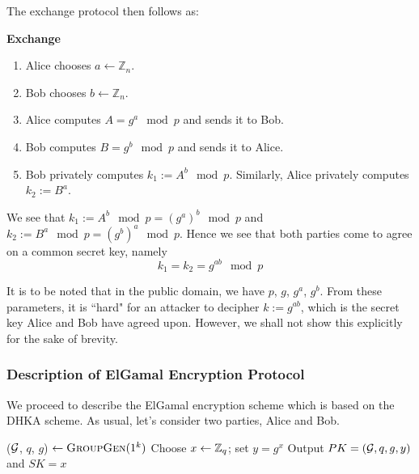 The exchange protocol then follows as:

\begin{tcolorbox}
\textbf{Exchange} 
\begin{enumerate}
    \item Alice chooses \( a \leftarrow \mathbb{Z}_n \). 
    \item Bob chooses \( b \leftarrow \mathbb{Z}_n \).
    \item Alice computes \( A = g^a \mod p \) and sends it to Bob.
    \item Bob computes \( B = g^b \mod p \) and sends it to Alice.
    \item Bob privately computes \( k_1 := A^b \mod p \). Similarly, Alice privately computes \( k_2 := B^a \).
\end{enumerate}
\end{tcolorbox}

We see that \( k_1 := A^b \mod p = (g^a)^b \mod p \) and \( k_2 := B^a \mod p = (g^b)^a \mod p \). Hence we see that both parties come to agree on a common secret key, namely
\begin{equation}
    k_1 = k_2 = g^{ab} \mod p
\end{equation}

It is to be noted that in the public domain, we have \( p \), \( g \), \( g^a \), \( g^b \). 
From these parameters, it is ``hard" for an attacker to decipher \( k := g^{ab} \), which is the secret key Alice and Bob have agreed upon. 
However, we shall not show this explicitly for the sake of brevity.
\subsubsection{Description of ElGamal Encryption Protocol}

We proceed to describe the ElGamal encryption scheme which is based on the DHKA scheme. As usual, let's consider two parties, Alice and Bob.



\smallskip


\begin{algorithmic}
\STATE ($ \mathcal{G} $, $ q $, $ g $) $ \leftarrow \textsc{GroupGen} (1^k) $ 
\STATE Choose $ x \leftarrow \mathbb{Z}_q $; set $ y = g^x $ 
\STATE Output $ PK = ( \mathcal{G}, q, g, y) $ and $ SK = x $ 
\end{algorithmic} 

